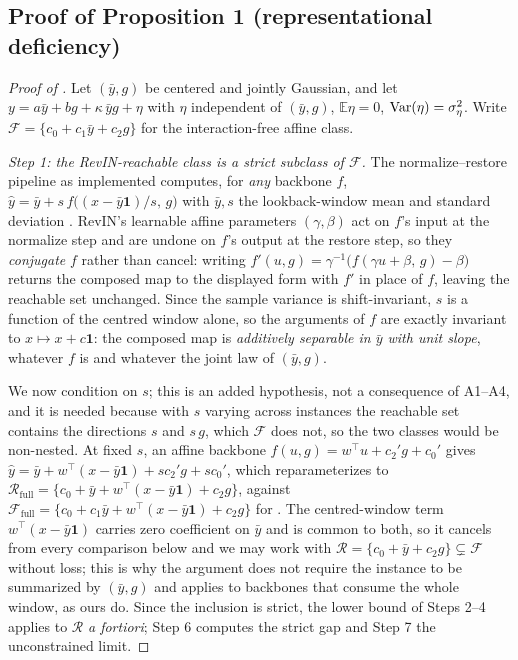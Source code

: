 \subsection{Proof of Proposition 1 (representational deficiency)}\label{app:proofs:prop1}

\begin{proof}[Proof of ]
Let $(\bar y, g)$ be centered and jointly Gaussian, and let $y = a\bar y + b g + \kappa\,\bar y g + \eta$ with $\eta$ independent of $(\bar y, g)$, $\mathbb{E}\eta = 0$, $\mathrm{Var}(\eta) = \sigma_\eta^2$. Write $\mathcal{F} = \{c_0 + c_1 \bar y + c_2 g\}$ for the interaction-free affine class.

\emph{Step 1: the RevIN-reachable class is a strict subclass of $\mathcal{F}$.}
The normalize--restore pipeline as implemented computes, for \emph{any} backbone $f$,
$\hat y = \bar y + s\, f\big((x - \bar y \mathbf{1})/s,\, g\big)$ with $\bar y, s$ the
lookback-window mean and standard deviation \citep{kim2022revin}. RevIN's learnable affine
parameters $(\gamma,\beta)$ act on $f$'s input at the normalize step and are undone on
$f$'s output at the restore step, so they \emph{conjugate} $f$ rather than cancel:
writing $f'(u,g) = \gamma^{-1}\bigl(f(\gamma u + \beta,\, g) - \beta\bigr)$ returns the
composed map to the displayed form with $f'$ in place of $f$, leaving the reachable set
unchanged. Since the sample variance is shift-invariant, $s$ is a function of the centred
window alone, so the arguments of $f$ are exactly invariant to $x \mapsto x + c\mathbf 1$:
the composed map is \emph{additively separable in $\bar y$ with unit slope}, whatever $f$
is and whatever the joint law of $(\bar y, g)$.

We now condition on $s$; this is an added hypothesis, not a consequence of A1--A4, and it
is needed because with $s$ varying across instances the reachable set contains the
directions $s$ and $s\,g$, which $\mathcal{F}$ does not, so the two classes would be
non-nested. At fixed $s$, an affine backbone $f(u,g) = w^\top u + c_2' g + c_0'$ gives
$\hat y = \bar y + w^\top(x - \bar y \mathbf 1) + s c_2' g + s c_0'$, which reparameterizes
to $\mathcal{R}_{\mathrm{full}} = \{c_0 + \bar y + w^\top(x - \bar y \mathbf 1) + c_2 g\}$,
against $\mathcal{F}_{\mathrm{full}} = \{c_0 + c_1\bar y + w^\top(x - \bar y \mathbf 1) + c_2 g\}$
for \rawm{}. The centred-window term $w^\top(x - \bar y \mathbf 1)$ carries zero coefficient
on $\bar y$ and is common to both, so it cancels from every comparison below and we may
work with $\mathcal{R} = \{c_0 + \bar y + c_2 g\} \subsetneq \mathcal{F}$ without loss;
this is why the argument does not require the instance to be summarized by $(\bar y, g)$
and applies to backbones that consume the whole window, as ours do. Since the inclusion
is strict, the lower bound of Steps 2--4 applies to $\mathcal{R}$ \emph{a fortiori};
Step 6 computes the strict gap and Step 7 the unconstrained limit.


\end{proof}
